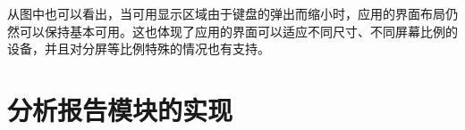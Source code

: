 \begin{figure}[ht]
    \centering
    \label{fig:history-time-picker}
\end{figure}

从图中也可以看出，当可用显示区域由于键盘的弹出而缩小时，应用的界面布局仍然可以保持基本可用。这也体现了应用的界面可以适应不同尺寸、不同屏幕比例的设备，并且对分屏等比例特殊的情况也有支持。


\section{分析报告模块的实现}\label{sec:analytics}

